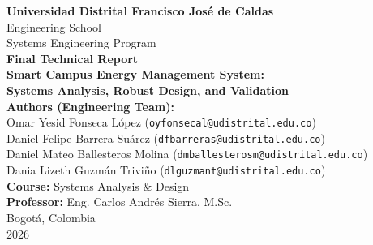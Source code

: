 \documentclass[12pt,a4paper]{article}
\begin{document}
\begin{titlepage}
    \centering
    \vspace*{1cm}
    {\Large \textbf{Universidad Distrital Francisco José de Caldas}} \\
    \vspace{0.4cm}
    {\large Engineering School \\ Systems Engineering Program} \\
    \vspace{2.5cm}
    {\Huge \textbf{Final Technical Report}} \\
    \vspace{0.5cm}
    {\Large \textbf{Smart Campus Energy Management System: \\ Systems Analysis, Robust Design, and Validation}} \\
    \vspace{2cm}
    \textbf{Authors (Engineering Team):} \\
    Omar Yesid Fonseca López (\texttt{oyfonsecal@udistrital.edu.co}) \\
    Daniel Felipe Barrera Suárez (\texttt{dfbarreras@udistrital.edu.co}) \\
    Daniel Mateo Ballesteros Molina (\texttt{dmballesterosm@udistrital.edu.co}) \\
    Dania Lizeth Guzmán Triviño (\texttt{dlguzmant@udistrital.edu.co}) \\
    \vfill
    \textbf{Course:} Systems Analysis \& Design \\
    \textbf{Professor:} Eng. Carlos Andrés Sierra, M.Sc. \\
    \vspace{1cm}
    Bogotá, Colombia \\
    2026
\end{titlepage}


\begin{abstract}
This comprehensive technical report consolidates the systems engineering lifecycle for the \textbf{Smart Campus Energy Management System}. The project addresses energy waste driven by human behavioral inertia through the design of a decentralized architecture that operates entirely within the \textit{User-Space}. The system incorporates a rigorous risk management framework (ISO 31000), fault tolerance via local persistence, and operational feasibility managed under strict software collaboration practices on GitHub. Validation through a discrete-event simulation confirmed that the autonomous agent achieves a \textbf{68.72\%} reduction in wasted energy, fulfilling 100\% of the quality metrics and demonstrating, under complexity theory, that the defined logical thresholds act as stable attractors for the system.
\end{abstract}
\end{document}
